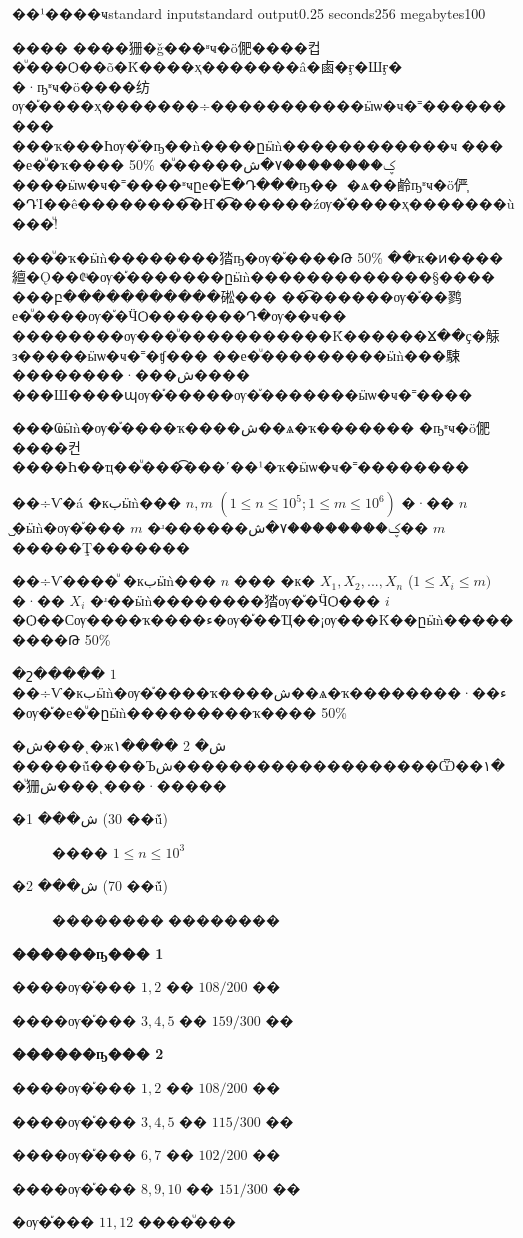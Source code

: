 \documentclass[11pt,a4paper]{article}
\begin{document}
\begin{problem}{��¹����ҹ}{standard input}{standard output}{0.25 seconds}{256 megabytes}{100}


���� ����㹪�ǧ���ʶҹ�ö俷����컵�ͧ���Ѻ��õ�Ǩ����ҳ�������â�鹵�ӻ�Шӻ� �·ҧʶҹ�ö����纺ѹ�֡����ҳ�������÷�����������ӹѡ�ҹ�˭��������� ���ҡ���Һѹ�֡�ҧ��ǹ����ըӹǹ������������ҹࡳ����е�ͧ�ҡ���� 50\% �ͧ�����ؼ��������٧�ش ����ӹѡ�ҹ�˭����ʶҹըе�ͧⴹ�Դ���ҧ��͹ �ѧ��鹷ҧʶҹ�ö俨֧�ԴἹ��ê��������͡�Ҥ�͡������źѹ�֡����ҳ�������ù���ͧ!

	���ͧ�ҡ�ӹǹ��������㹺ҧ�ѹ�֡����Թ 50\% ��ҡ�ͷ����繵�Ǫ��¢ͧ�ѹ�֡�������ըӹǹ�������������§���� ���բ�����������硹��� ��͡������ѹ�֡��鹨е�ͧ����ѹ�֡�ӴѺ�������Դ�ѹ��ҹ�� ��������ѹ���ͧ�����������Ǩ������ⴴ��ҫ�觨з�����ӹѡ�ҹ�˭�ʧ��� ��е�ͧ���������ӹǹ���駷��������·���ش���� ���Ш����պѹ�֡�����ѹ�֡�������ӹѡ�ҹ�˭����

	���Ҩӹǹ�ѹ�֡����ҡ����ش��ѧ�ҡ������� �ҧʶҹ�ö俷����컨����Һ��ҵ��ͧ���͡���ʹ��¹�ҡ�ӹѡ�ҹ�˭�������� 

\InputFile
��÷Ѵ�á �кبӹǹ��� $ n,m$ $( 1\leq n\leq10^5 ; 1\leq m\leq10^6)$ �·�� $n$ ᷹�ӹǹ�ѹ�֡��� $m$ �ʴ������ؼ��������٧�ش�� $m$ �����Ţ�������

��÷Ѵ����ͧ �кبӹǹ��� $n$ ��� �к� $X_1, X_2, ..., X_n$ ($1\leq X_i\leq m
)$ �·��  $X_i$ �ʴ��ӹǹ��������㹺ѹ�֡�ӴѺ��� $i$ �Ѻ��Сѹ����ҡ����ء�ѹ�֡��Ҵ��¡ѹ���Ǩ��ըӹǹ���������Թ 50\% 

\OutputFile
�շ����� $1$ ��÷Ѵ�кبӹǹ�ѹ�֡����ҡ����ش��ѧ�ҡ��������·��ء�ѹ�֡�е�ͧ�ըӹǹ���������ҡ���� 50\%

\Scoring
�ش���ͺ�ж١���� 2 �ش �����ṹ����Ъش�������������������Ѿ��١��ͧ㹪ش���ͺ���·�����

\begin{description}

\item[�ش��� 1 (30 ��ṹ)] ���� $ 1\leq n\leq10^3$

\item[�ش��� 2 (70 ��ṹ)] ��������͹��������

\end{description}

\Examples

\begin{example}
%
%
\end{example}

\Note
\begin{note}
\textbf{������ҧ��� 1}

����ѹ�֡��� $1,2$ �� $108/200$ ��

����ѹ�֡��� $3,4,5$ �� $159/300$ ��

\textbf{������ҧ��� 2}

����ѹ�֡��� $1,2$ �� $108/200$ ��

����ѹ�֡��� $3,4,5$ �� $115/300$ ��

����ѹ�֡��� $6,7$ �� $102/200$ ��

����ѹ�֡��� $8,9,10$ �� $151/300$ ��

�ѹ�֡��� $11,12$ ����ͧ���

\end{note}


\end{problem}
\end{document}
